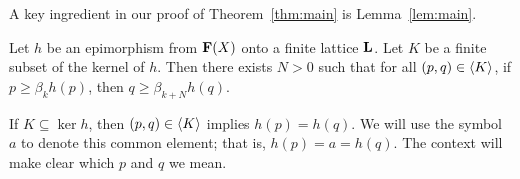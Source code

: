 A key ingredient in our proof of Theorem~\ref{thm:main} is Lemma~\ref{lem:main}.


\begin{lemma}\label{lem:main}
Let $h$ be an epimorphism from $\mathbf{F}(X)$ onto a finite lattice $\mathbf{L}$.
Let $K$ be a finite subset of the kernel of $h$.
Then there exists $N>0$ such that for all $(p,q) \in \langle K\rangle$, if $p\geq \beta_k h(p)$,
then $q \geq \beta_{k+N}h(q)$.
\end{lemma}

\begin{remark}
If $K \subseteq \ker h$, then $(p,q) \in \langle K\rangle$ implies $h(p) = h(q)$. 
We will use the symbol $a$ to denote this common element; that is, $h(p) = a = h(q)$.
The context will make clear which $p$ and $q$ we mean.
\end{remark}
  
